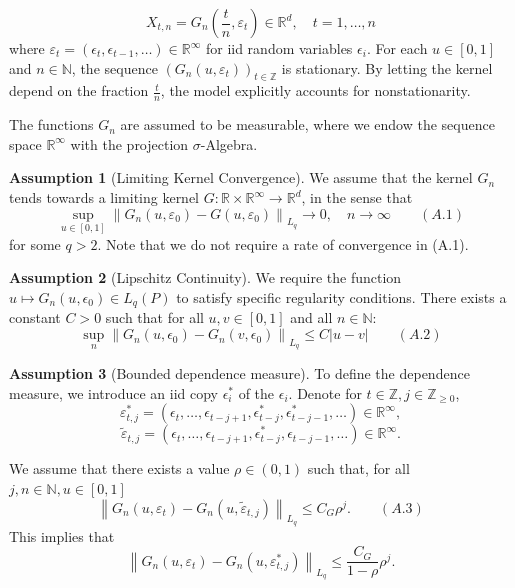\documentclass[12pt,a4paper]{article}
\theoremstyle{definition}
\newtheorem{assumption}{Assumption}[section]
\theoremstyle{definition}
\theoremstyle{theorem}
\begin{document}
\begin{equation}
    X_{t,n} = G_n\left(\frac{t}{n}, \varepsilon_t\right) \in \mathbb{R}^d, \quad t = 1, \dots, n
    \label{eq: dgp}
\end{equation} 
where ${\varepsilon}_t = (\epsilon_t, \epsilon_{t-1}, \dots) \in \mathbb{R}^\infty$ for iid random variables $\epsilon_i$. For each $u \in [0, 1]$ and $n \in \mathbb{N}$, the sequence $(G_n(u, \varepsilon_t))_{t \in \mathbb{Z}}$ is stationary. By letting the kernel depend on the fraction $\frac{t}{n}$, the model explicitly accounts for nonstationarity.

The functions $G_n$ are assumed to be measurable, where we endow the sequence space $\mathbb{R}^\infty$ with the projection $\sigma$-Algebra.

\begin{assumption}[Limiting Kernel Convergence]
We assume that the kernel $G_n$ tends towards a limiting kernel $G : \mathbb{R} \times \mathbb{R}^\infty \to \mathbb{R}^d$, in the sense that
$$\sup_{u \in [0,1]} \left\| G_n(u, \varepsilon_0) - G(u, \varepsilon_0) \right\|_{L_q} \to 0, \quad n \to \infty \qquad (A.1)$$
for some $q > 2$. Note that we do not require a rate of convergence in (A.1).
\end{assumption}

\begin{assumption}[Lipschitz Continuity]
We require the function $u \mapsto G_n(u, \epsilon_0) \in L_q(P)$ to satisfy specific regularity conditions. There exists a constant $C > 0$ such that for all $u, v \in [0, 1]$ and all $n \in \mathbb{N}$:
$$\sup_n \left\| G_n(u, \epsilon_0) - G_n(v, \epsilon_0) \right\|_{L_q} \le C |u - v|\qquad (A.2)$$
\end{assumption}

\begin{assumption}[Bounded dependence measure]
 To define the dependence measure, we introduce an iid copy $\epsilon_i^*$ of the $\epsilon_i$. Denote for $t \in \mathbb{Z}, j \in \mathbb{Z}_{\ge 0}$,
$$\varepsilon_{t,j}^* = (\epsilon_t, \dots, \epsilon_{t-j+1}, \epsilon_{t-j}^*, \epsilon_{t-j-1}^*, \dots) \in \mathbb{R}^\infty,$$
$$\tilde{\varepsilon}_{t,j} = (\epsilon_t, \dots, \epsilon_{t-j+1}, \epsilon_{t-j}^*, \epsilon_{t-j-1}, \dots) \in \mathbb{R}^\infty.$$

We assume that there exists a value $\rho \in (0, 1)$ such that, for all $j, n \in \mathbb{N}, u \in [0, 1]$
$$\left\| G_n(u, \varepsilon_t) - G_n(u, \tilde{\varepsilon}_{t,j}) \right\|_{L_q} \le C_G \rho^j. \qquad (A.3)$$
This implies that
$$\left\| G_n(u, \varepsilon_t) - G_n(u, \varepsilon_{t,j}^*) \right\|_{L_q} \le \frac{C_G}{1 - \rho} \rho^j.$$
\end{assumption}
\end{document}
